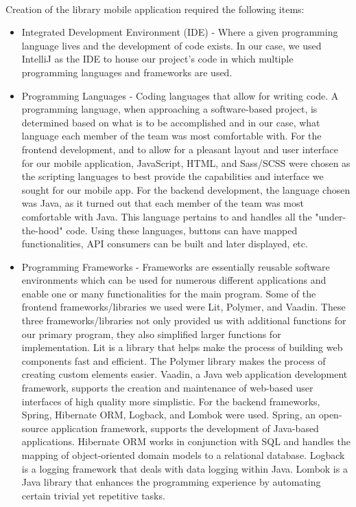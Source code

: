     \paragraph{}
    Creation of the library mobile application required the following items:
    \begin{itemize}
        \item Integrated Development Environment (IDE) - Where a given programming language lives and the development of code exists. In our case, we used IntelliJ as the IDE to house our project's code in which multiple programming languages and frameworks are used.
        
        \item Programming Languages - Coding languages that allow for writing code. A programming language, when approaching a software-based project, is determined based on what is to be accomplished and in our case, what language each member of the team was most comfortable with. For the frontend development, and to allow for a pleasant layout and user interface for our mobile application, JavaScript, HTML, and Sass/SCSS were chosen as the scripting languages to best provide the capabilities and interface we sought for our mobile app. For the backend development, the language chosen was Java, as it turned out that each member of the team was most comfortable with Java. This language pertains to and handles all the "under-the-hood" code. Using these languages, buttons can have mapped functionalities, API consumers can be built and later displayed, etc. 
        
        \item Programming Frameworks - Frameworks are essentially reusable software environments which can be used for numerous different applications and enable one or many functionalities for the main program. Some of the frontend frameworks/libraries we used were Lit, Polymer, and Vaadin. These three frameworks/libraries not only provided us with additional functions for our primary program, they also simplified larger functions for implementation. Lit is a library that helps make the process of building web components fast and efficient. The Polymer library makes the process of creating custom elements easier. Vaadin, a Java web application development framework, supports the creation and maintenance of web-based user interfaces of high quality more simplistic. For the backend frameworks, Spring, Hibernate ORM, Logback, and Lombok were used. Spring, an open-source application framework, supports the development of Java-based applications. Hibernate ORM works in conjunction with SQL and handles the mapping of object-oriented domain models to a relational database. Logback is a logging framework that deals with data logging within Java. Lombok is a Java library that enhances the programming experience by automating certain trivial yet repetitive tasks.
    \end{itemize}
    \newpage
    
